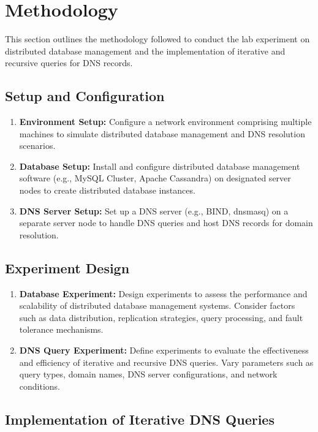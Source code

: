 \documentclass[11pt]{article}
\begin{document}
\section{Methodology}

This section outlines the methodology followed to conduct the lab experiment on distributed database management and the implementation of iterative and recursive queries for DNS records.

\subsection{Setup and Configuration}

\begin{enumerate}
\item \textbf{Environment Setup:} Configure a network environment comprising multiple machines to simulate distributed database management and DNS resolution scenarios.
\item \textbf{Database Setup:} Install and configure distributed database management software (e.g., MySQL Cluster, Apache Cassandra) on designated server nodes to create distributed database instances.
\item \textbf{DNS Server Setup:} Set up a DNS server (e.g., BIND, dnsmasq) on a separate server node to handle DNS queries and host DNS records for domain resolution.
\end{enumerate}

\subsection{Experiment Design}

\begin{enumerate}
\item \textbf{Database Experiment:} Design experiments to assess the performance and scalability of distributed database management systems. Consider factors such as data distribution, replication strategies, query processing, and fault tolerance mechanisms.
\item \textbf{DNS Query Experiment:} Define experiments to evaluate the effectiveness and efficiency of iterative and recursive DNS queries. Vary parameters such as query types, domain names, DNS server configurations, and network conditions.
\end{enumerate}

\subsection{Implementation of Iterative DNS Queries}
\end{document}
